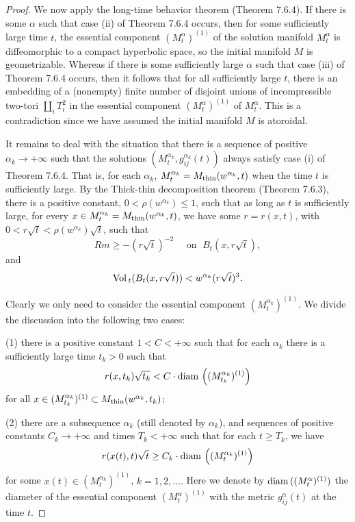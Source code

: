 \begin{proof}
We now apply the long-time behavior theorem (Theorem 7.6.4). If
there is some $\alpha$ such that case (ii) of Theorem 7.6.4
occurs, then for some sufficiently large time $t$, the essential
component $(M^{\alpha}_t)^{(1)}$ of the solution manifold
$M^{\alpha}_t$ is diffeomorphic to a compact hyperbolic space, so
the initial manifold $M$ is geometrizable. Whereas if there is
some sufficiently large $\alpha$ such that case (iii) of Theorem
7.6.4  occurs, then it follows that for all sufficiently large
$t$, there is an embedding of a (nonempty) finite number of
disjoint unions of incompressible two-tori $\coprod_{i} T_i^2 $ in
the essential component $(M^{\alpha}_t)^{(1)}$ of $M^{\alpha}_t$.
This is a contradiction since we have assumed the initial manifold
$M$ is atoroidal.

It remains to deal with the situation that there is a sequence of
positive $\alpha_k \rightarrow +\infty$ such that the solutions
$(M^{\alpha_k}_t,g^{\alpha_k}_{ij}(t))$ always satisfy case (i) of
Theorem 7.6.4. That is, for each $\alpha_k$, $M^{\alpha_k}_t =
M_{\rm thin}(w^{\alpha_k},t)$ when the time $t$ is sufficiently
large. By the Thick-thin decomposition theorem (Theorem 7.6.3),
there is a positive constant, $0<\rho(w^{\alpha_k}) \leq 1$, such
that as long as $t$ is sufficiently large, for every $x\in
M^{\alpha_k}_t = M_{\rm thin}(w^{\alpha_k},t)$, we have some
$r=r(x,t)$, with $0<r\sqrt{t}<\rho(w^{\alpha_k})\sqrt{t}$, such
that \begin{equation} Rm\geq -(r\sqrt{t})^{-2} \quad \mbox{ on } \;
B_t(x,r\sqrt{t}),
\end{equation} and \begin{equation}
\Vol_t(B_t(x,r\sqrt{t}))<w^{\alpha_k}(r\sqrt{t})^3. %
\end{equation}

Clearly we only need to consider the essential component
$(M^{\alpha_k}_{t})^{(1)}$.  We divide the discussion into the
following two cases:

\smallskip
(1) there is a positive constant $1<C<+\infty$ such that for each
$\alpha_k$ there is a sufficiently large time $t_k>0$ such that
\begin{equation} r(x,t_k)\sqrt{t_k} < C \cdot {\rm
diam}\,\left((M^{\alpha_k}_{t_k})^{(1)}\right)
\end{equation} for all $x\in (M^{\alpha_k}_{t_k})^{(1)} \subset M_{\rm
thin}(w^{\alpha_k},{t_k})$;

\smallskip
(2) there are a subsequence $\alpha_k$ (still denoted by
$\alpha_k$), and sequences of positive constants $C_k \rightarrow
+\infty$ and times $T_k < +\infty$ such that for each $t \geq
T_k$, we have \begin{equation} r(x(t),t)\sqrt{t} \geq C_k \cdot {\rm diam}\,
\left((M^{\alpha_k}_{t})^{(1)}\right)
\end{equation} for some $x(t) \in (M^{\alpha_k}_{t})^{(1)}$, $k=1,2,\ldots.$
Here we denote by ${\rm diam}\,((M^{\alpha}_t)^{(1)})$ the
diameter of the essential component $(M^{\alpha}_t)^{(1)}$ with
the metric $g^{\alpha}_{ij}(t)$ at the time $t$.


\end{proof}
